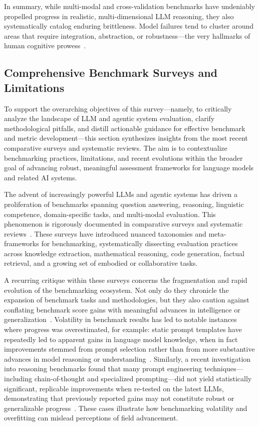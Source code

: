 \documentclass[sigconf]{acmart}
\begin{document}
In summary, while multi-modal and cross-validation benchmarks have undeniably propelled progress in realistic, multi-dimensional LLM reasoning, they also systematically catalog enduring brittleness. Model failures tend to cluster around areas that require integration, abstraction, or robustness---the very hallmarks of human cognitive prowess~\cite{ref79,ref85,ref92,ref94,ref95}.

\subsection{Comprehensive Benchmark Surveys and Limitations}

To support the overarching objectives of this survey---namely, to critically analyze the landscape of LLM and agentic system evaluation, clarify methodological pitfalls, and distill actionable guidance for effective benchmark and metric development---this section synthesizes insights from the most recent comparative surveys and systematic reviews. The aim is to contextualize benchmarking practices, limitations, and recent evolutions within the broader goal of advancing robust, meaningful assessment frameworks for language models and related AI systems.

The advent of increasingly powerful LLMs and agentic systems has driven a proliferation of benchmarks spanning question answering, reasoning, linguistic competence, domain-specific tasks, and multi-modal evaluation. This phenomenon is rigorously documented in comparative surveys and systematic reviews~\cite{ref1, ref2, ref3, ref4, ref5, ref10, ref11, ref12, ref15, ref20, ref22, ref23, ref31, ref36, ref37, ref38, ref39, ref43, ref46, ref47, ref50, ref55, ref61, ref62, ref63, ref64, ref74, ref75, ref80, ref86, ref87, ref89}. These surveys have introduced nuanced taxonomies and meta-frameworks for benchmarking, systematically dissecting evaluation practices across knowledge extraction, mathematical reasoning, code generation, factual retrieval, and a growing set of embodied or collaborative tasks.

A recurring critique within these surveys concerns the fragmentation and rapid evolution of the benchmarking ecosystem. Not only do they chronicle the expansion of benchmark tasks and methodologies, but they also caution against conflating benchmark score gains with meaningful advances in intelligence or generalization~\cite{ref3, ref5, ref11, ref36, ref38}. Volatility in benchmark results has led to notable instances where progress was overestimated, for example: static prompt templates have repeatedly led to apparent gains in language model knowledge, when in fact improvements stemmed from prompt selection rather than from more substantive advances in model reasoning or understanding~\cite{ref98, ref99}. Similarly, a recent investigation into reasoning benchmarks found that many prompt engineering techniques---including chain-of-thought and specialized prompting---did not yield statistically significant, replicable improvements when re-tested on the latest LLMs, demonstrating that previously reported gains may not constitute robust or generalizable progress~\cite{ref22}. These cases illustrate how benchmarking volatility and overfitting can mislead perceptions of field advancement.
\end{document}
